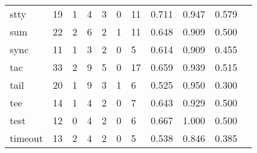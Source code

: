 \begin{longtable}{lp{1.10cm}p{1.10cm}p{1.10cm}p{1.10cm}p{1.10cm}p{1.10cm}p{1.10cm}p{1.10cm}p{1.10cm}p{1.10cm}}
stty      &                     19 &                                  1 &                                 4 &                                3 &                                 0 &                              11 &                          0.711 &                                 0.947 &                               0.579 \\
sum       &                     22 &                                  2 &                                 6 &                                2 &                                 1 &                              11 &                          0.648 &                                 0.909 &                               0.500 \\
sync      &                     11 &                                  1 &                                 3 &                                2 &                                 0 &                               5 &                          0.614 &                                 0.909 &                               0.455 \\
tac       &                     33 &                                  2 &                                 9 &                                5 &                                 0 &                              17 &                          0.659 &                                 0.939 &                               0.515 \\
tail      &                     20 &                                  1 &                                 9 &                                3 &                                 1 &                               6 &                          0.525 &                                 0.950 &                               0.300 \\
tee       &                     14 &                                  1 &                                 4 &                                2 &                                 0 &                               7 &                          0.643 &                                 0.929 &                               0.500 \\
test      &                     12 &                                  0 &                                 4 &                                2 &                                 0 &                               6 &                          0.667 &                                 1.000 &                               0.500 \\
timeout   &                     13 &                                  2 &                                 4 &                                2 &                                 0 &                               5 &                          0.538 &                                 0.846 &                               0.385 \\

\end{longtable}

